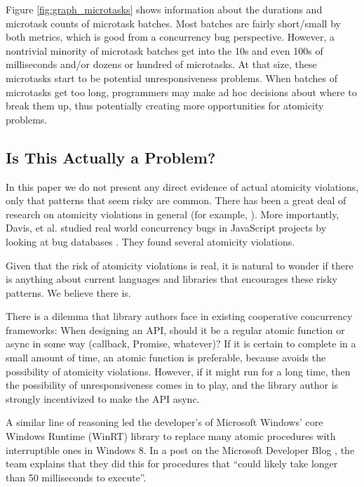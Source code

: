 \documentclass[sigplan,10pt,review,anonymous]{acmart}\settopmatter{printfolios=true,printccs=false,printacmref=false}
\begin{document}
Figure \ref{fig:graph_microtasks} shows information about the durations and microtask counts of microtask batches.
Most batches are fairly short/small by both metrics, which is good from a concurrency bug perspective.
However, a nontrivial minority of microtask batches get into the 10s and even 100s of milliseconds and/or dozens or hundred of microtasks.
At that size, these microtasks start to be potential unresponsiveness problems.
When batches of microtasks get too long, programmers may make ad hoc decisions about where to break them up, thus potentially creating more opportunities for atomicity problems.

\subsection{Is This Actually a Problem?}

In this paper we do not present any direct evidence of actual atomicity violations, only that patterns that seem risky are common.
There has been a great deal of research on atomicity violations in general (for example, \cite{Lu2008}).
More importantly, Davis, et al. studied real world concurrency bugs in JavaScript projects by looking at bug databases \cite{Davis2017}.
They found several atomicity violations.

Given that the risk of atomicity violations is real, it is natural to wonder if there is anything about current languages and libraries that encourages these risky patterns.
We believe there is.

There is a dilemma that library authors face in existing cooperative concurrency frameworks:
When designing an API, should it be a regular atomic function or async in some way (callback, Promise, whatever)?
If it is certain to complete in a small amount of time, an atomic function is preferable, because avoids the possibility of atomicity violations.
However, if it might run for a long time, then the possibility of unresponsiveness comes in to play, and the library author is strongly incentivized to make the API async.

A similar line of reasoning led the developer's of Microsoft Windows' core Windows Runtime (WinRT) library to replace many atomic procedures with interruptible ones in Windows 8.
In a post on the Microsoft Developer Blog \cite{Windows8Team2012}, the team explains that they did this for procedures that ``could likely take longer than 50 milliseconds to execute''.
\end{document}

